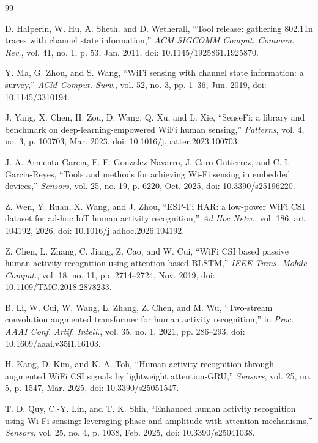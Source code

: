 \documentclass{ieeeaccess}
\begin{document}
\begin{thebibliography}{99}

D. Halperin, W. Hu, A. Sheth, and D. Wetherall, ``Tool release: gathering 802.11n traces with channel state information,'' \emph{ACM SIGCOMM Comput. Commun. Rev.}, vol. 41, no. 1, p. 53, Jan. 2011, doi: 10.1145/1925861.1925870.

Y. Ma, G. Zhou, and S. Wang, ``WiFi sensing with channel state information: a survey,'' \emph{ACM Comput. Surv.}, vol. 52, no. 3, pp. 1--36, Jun. 2019, doi: 10.1145/3310194.

J. Yang, X. Chen, H. Zou, D. Wang, Q. Xu, and L. Xie, ``SenseFi: a library and benchmark on deep-learning-empowered WiFi human sensing,'' \emph{Patterns}, vol. 4, no. 3, p. 100703, Mar. 2023, doi: 10.1016/j.patter.2023.100703.

J. A. Armenta-Garcia, F. F. Gonzalez-Navarro, J. Caro-Gutierrez, and C. I. Garcia-Reyes, ``Tools and methods for achieving Wi-Fi sensing in embedded devices,'' \emph{Sensors}, vol. 25, no. 19, p. 6220, Oct. 2025, doi: 10.3390/s25196220.

Z. Wen, Y. Ruan, X. Wang, and J. Zhou, ``ESP-Fi HAR: a low-power WiFi CSI dataset for ad-hoc IoT human activity recognition,'' \emph{Ad Hoc Netw.}, vol. 186, art. 104192, 2026, doi: 10.1016/j.adhoc.2026.104192.

Z. Chen, L. Zhang, C. Jiang, Z. Cao, and W. Cui, ``WiFi CSI based passive human activity recognition using attention based BLSTM,'' \emph{IEEE Trans. Mobile Comput.}, vol. 18, no. 11, pp. 2714--2724, Nov. 2019, doi: 10.1109/TMC.2018.2878233.

B. Li, W. Cui, W. Wang, L. Zhang, Z. Chen, and M. Wu, ``Two-stream convolution augmented transformer for human activity recognition,'' in \emph{Proc. AAAI Conf. Artif. Intell.}, vol. 35, no. 1, 2021, pp. 286--293, doi: 10.1609/aaai.v35i1.16103.

H. Kang, D. Kim, and K.-A. Toh, ``Human activity recognition through augmented WiFi CSI signals by lightweight attention-GRU,'' \emph{Sensors}, vol. 25, no. 5, p. 1547, Mar. 2025, doi: 10.3390/s25051547.

T. D. Quy, C.-Y. Lin, and T. K. Shih, ``Enhanced human activity recognition using Wi-Fi sensing: leveraging phase and amplitude with attention mechanisms,'' \emph{Sensors}, vol. 25, no. 4, p. 1038, Feb. 2025, doi: 10.3390/s25041038.


\end{thebibliography}
\end{document}
